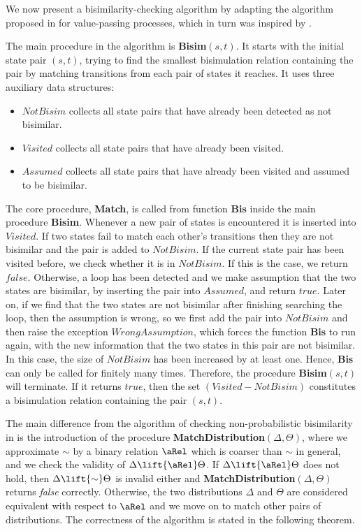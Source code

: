 \documentclass{article}
\def \BISI{\sim}
\begin{document}
We now present a bisimilarity-checking algorithm by adapting the
algorithm proposed in \cite{Lin98} for value-passing processes,
which in turn was inspired by \cite{FM90}.

The main procedure in the algorithm is \textbf{Bisim}$(s,t)$. It
starts with the initial state pair $(s,t)$, trying to find the
smallest bisimulation relation containing the pair by matching
transitions from each pair of states it reaches.  It uses three
auxiliary data structures:
\begin{itemize}
\item $NotBisim$ collects all state pairs that have already been
  detected as not bisimilar.
\item $Visited$ collects all state pairs that have already been
  visited.
\item $Assumed$ collects all state pairs that have already been
  visited and assumed to be bisimilar.
\end{itemize}
The core procedure, \textbf{Match}, is called from function
\textbf{Bis} inside the main procedure \textbf{Bisim}. Whenever a
new pair of states is encountered it is inserted into $Visited$. If
two states fail to match each other's transitions then they are not
bisimilar and the pair is added to $NotBisim$. If the current state
pair has been visited before, we check whether it is in $NotBisim$.
If this is the case, we return $false$. Otherwise, a loop has been
detected and we make assumption that the two states are bisimilar,
by inserting the pair into $Assumed$, and return $true$. Later on,
if we find that the two states are not bisimilar after finishing
searching the loop, then the assumption is wrong, so we first add
the pair into $NotBisim$ and then raise the exception
$WrongAssumption$, which forces the function \textbf{Bis} to run
again, with the new information that the two states in this pair are
not bisimilar. In this case, the size of $NotBisim$ has been
increased by at least one. Hence, \textbf{Bis} can only be called
for finitely many times. Therefore, the procedure
\textbf{Bisim}$(s,t)$ will terminate. If it returns $true$, then the
set $(Visited - NotBisim)$ constitutes a bisimulation relation
containing the pair $(s,t)$.

The main difference from the algorithm of checking non-probabilistic
bisimilarity in \cite{Lin98} is the introduction of the procedure
\textbf{MatchDistribution}$(\Delta,\Theta)$, where we approximate
$\BISI$ by a  binary relation $\aRel$ which is coarser than $\BISI$
in general, and we check the validity of $\Delta\lift{\aRel}\Theta$.
If $\Delta\lift{\aRel}\Theta$ does not hold, then
$\Delta\lift{\BISI}\Theta$ is invalid either and
\textbf{MatchDistribution}$(\Delta,\Theta)$ returns \textit{false}
correctly. Otherwise, the two distributions $\Delta$ and $\Theta$
are considered equivalent with respect to $\aRel$ and we move on to
match other pairs of distributions. The correctness of the algorithm
is stated in the following theorem.
\end{document}

